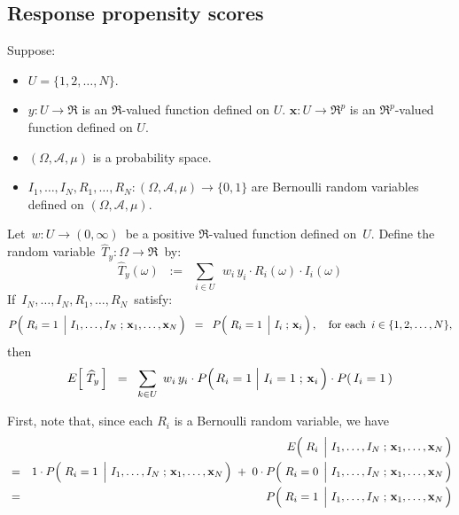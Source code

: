 

\subsection{Response propensity scores}

\begin{proposition}\label{PropnPropensityScore} 
\mbox{}\vskip 0.1cm
\noindent
Suppose:
\begin{itemize}
\item
	$U = \{1,2,\ldots,N\}$.
\item
	$y : U \longrightarrow \Re$ is an $\Re$-valued function defined on $U$.\;
	$\mathbf{x} : U \longrightarrow \Re^{p}$ is an $\Re^{p}$-valued function defined on $U$.
\item
	$(\Omega,\mathcal{A},\mu)$ is a probability space.
\item
	$I_{1},\ldots,I_{N},R_{1},\ldots,R_{N} : (\Omega,\mathcal{A},\mu) \longrightarrow \{0,1\}$
	are Bernoulli random variables defined on $(\Omega,\mathcal{A},\mu)$. 
\end{itemize}
Let \,$w : U \longrightarrow (0,\infty)$\, be a positive $\Re$-valued function defined on \,$U$.
Define the random variable \,$\widehat{T}_{y} : \Omega \longrightarrow \Re$\, by:
\begin{equation*}
\widehat{T}_{y}(\omega)
\;\; := \;\;
	\underset{i \in U}{\sum}\,\;w_{i}\,y_{i}\cdot R_{i}(\omega) \cdot I_{i}(\omega)
\end{equation*}
If \,$I_{N},\ldots,I_{N},R_{1}, \ldots, R_{N}$\, satisfy:
\begin{equation*}
P\!\left(\,
	\left.\overset{{\color{white}.}}{R_{i}}=1\;\,\right\vert\,
	I_{1},\ldots,I_{N}\;;\,\mathbf{x}_{1},\ldots,\mathbf{x}_{N}
	\,\right)
\;\; = \;\;
	P\!\left(\,\left.\overset{{\color{white}.}}{R_{i}}=1\;\,\right\vert\,I_{i}\;;\,\mathbf{x}_{i}\,\right),
\quad
\textnormal{for each \,$i \in \{1,2,\ldots,N\}$},
\end{equation*}
then
\begin{equation*}
E\!\left[\;\widehat{T}_{y}\,\right]
\;\; = \;\;
	\underset{k \in U}{\sum}\;\,w_{i}\,y_{i}
	\cdot P\!\left(\left.\overset{{\color{white}.}}{R_{i}}=1\;\right\vert\,I_{i}=1\;;\,\mathbf{x}_{i}\,\right) 
	\cdot P(\,I_{i}=1\,)
\end{equation*}
\end{proposition}
\proof
First, note that, since each $R_{i}$ is a Bernoulli random variable, we have
\begin{eqnarray*}
&&
	E\!\left(\,
	\left.\overset{{\color{white}.}}{R_{i}}\;\,\right\vert\,
	I_{1},\ldots,I_{N}\;;\,\mathbf{x}_{1},\ldots,\mathbf{x}_{N}
	\,\right)
\\
& = &
	1 \cdot P\!\left(\,
		\left.\overset{{\color{white}.}}{R_{i}}=1\;\,\right\vert\,
		I_{1},\ldots,I_{N}\;;\,\mathbf{x}_{1},\ldots,\mathbf{x}_{N}
		\,\right)
	\; + \;
	0 \cdot P\!\left(\,
		\left.\overset{{\color{white}.}}{R_{i}}=0\;\,\right\vert\,
		I_{1},\ldots,I_{N}\;;\,\mathbf{x}_{1},\ldots,\mathbf{x}_{N}
		\,\right)
\\
& = &
	P\!\left(\,
		\left.\overset{{\color{white}.}}{R_{i}}=1\;\,\right\vert\,
		I_{1},\ldots,I_{N}\;;\,\mathbf{x}_{1},\ldots,\mathbf{x}_{N}
		\,\right)
\end{eqnarray*}
